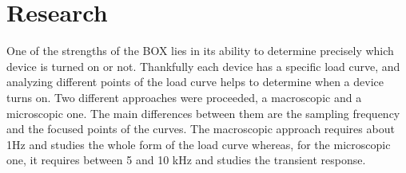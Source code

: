 %
%
\section{Research}

One of the strengths of the BOX lies in its ability to determine precisely which device is turned on or not. Thankfully each device has a specific load curve, and analyzing different points of the load curve helps to determine when a device turns on. Two different approaches were proceeded, a macroscopic and a microscopic one. The main differences between them are the sampling frequency and the focused points of the curves. The macroscopic approach requires about 1Hz and studies the whole form of the load curve whereas, for the microscopic one, it requires between 5 and 10 kHz and studies the transient response.




